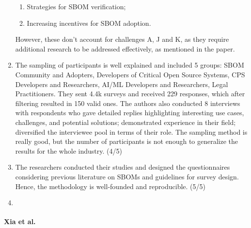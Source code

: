 \begin{enumerate}
\begin{enumerate}[label=\Alph*.]
                \item Strategies for SBOM verification;
                \item Increasing incentives for SBOM adoption.
            \end{enumerate}
            However, these don't account for challenges A, J and K, as they require additional research to be addressed effectively, as mentioned in the paper.
    \item The sampling of participants is well explained and included 5 groups: SBOM Community and Adopters, Developers of Critical Open Source Systems, CPS Developers and Researchers, AI/ML Developers and Researchers, Legal Practitioners.
          They sent 4.4k surveys and received 229 responses, which after filtering resulted in 150 valid ones. The authors also conducted 8 interviews with respondents who gave detailed replies highlighting interesting use cases, challenges, and potential solutions; demonstrated experience in their field; diversified the interviewee pool in terms of their role.
          The sampling method is really good, but the number of participants is not enough to generalize the results for the whole industry. (4/5)
    \item The researchers conducted their studies and designed the questionnaires considering previous literature on SBOMs and guidelines for survey design. Hence, the methodology is well-founded and reproducible. (5/5)
    \item
\end{enumerate}

\paragraph{Xia et al. \cite{article:sbom-study}}

